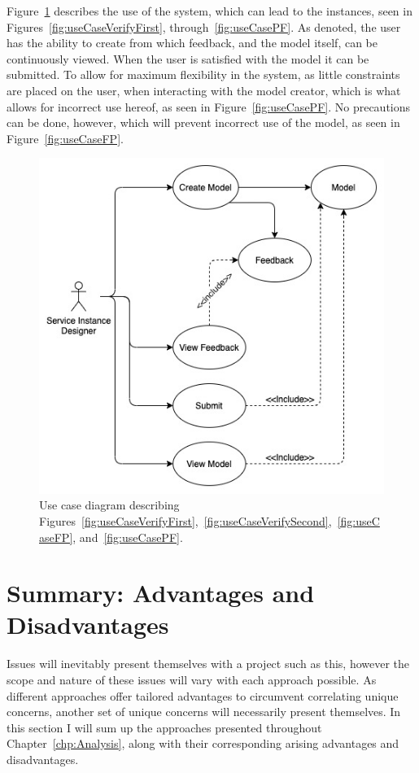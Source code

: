 \newpage
\noindent
Figure~\ref{fig:useCaseDiagram} describes the use of the system, which can lead to the instances, seen in Figures~\ref{fig:useCaseVerifyFirst}, through~\ref{fig:useCasePF}. As denoted, the user has the ability to create from which feedback, and the model itself, can be continuously viewed. When the user is satisfied with the model it can be submitted. To allow for maximum flexibility in the system, as little constraints are placed on the user, when interacting with the model creator, which is what allows for incorrect use hereof, as seen in Figure~\ref{fig:useCasePF}. No precautions can be done, however, which will prevent incorrect use of the model, as seen in Figure~\ref{fig:useCaseFP}.
\begin{figure}[h]
  \centering
  \includegraphics[width=0.8\linewidth]{figures/UCD.jpg}
  \caption{Use case diagram describing Figures~\ref{fig:useCaseVerifyFirst},~\ref{fig:useCaseVerifySecond},~\ref{fig:useCaseFP}, and~\ref{fig:useCasePF}.}
  \label{fig:useCaseDiagram}
\end{figure}
\section{Summary: Advantages and Disadvantages} 
Issues will inevitably present themselves with a project such as this, however the scope and nature of these issues will vary with each approach possible. As different approaches offer tailored advantages to circumvent correlating unique concerns, another set of unique concerns will necessarily present themselves. In this section I will sum up the approaches presented throughout Chapter~\ref{chp:Analysis}, along with their corresponding arising advantages and disadvantages.
